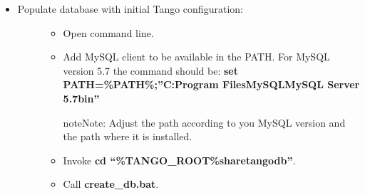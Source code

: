 \documentclass[letterpaper,10pt,english]{sphinxmanual}
\begin{document}
\begin{itemize}
\begin{description}
\begin{itemize}
\item {} 
Invoke command: \textbf{\%TANGO\_ROOT\%bindbconfig.exe}.
\begin{quote}

\begin{notice}{note}{Note:}
This let you setup two environment variables
 and  used to MySQL server. You may use  credentials
provided upon MySQL installation if it is your development workstation. For production environment it is
suggested to create additional user with  privileges. On Windows you may use 
from \emph{Start} menu and select the option \emph{Reconfigure} for MySQL Server.
Please refer to: \href{http://dev.mysql.com/doc/refman/5.7/en/adding-users.html}{http://dev.mysql.com/doc/refman/5.7/en/adding-users.html}
\end{notice}
\end{quote}

\end{itemize}

\end{description}

\item {} \begin{description}
\item[{Populate database with initial Tango configuration:}] \leavevmode\begin{itemize}
\item {} 
Open command line.

\item {} 
Add MySQL client to be available in the PATH. For MySQL version 5.7 the command should be:
\textbf{set PATH=\%PATH\%;''C:Program FilesMySQLMySQL Server 5.7bin''}

\begin{notice}{note}{Note:}
Adjust the path according to you MySQL version and the path where it is installed.
\end{notice}

\item {} 
Invoke \textbf{cd ``\%TANGO\_ROOT\%sharetangodb''}.

\item {} 
Call \textbf{create\_db.bat}.

\end{itemize}

\end{description}


\end{itemize}
\end{document}
